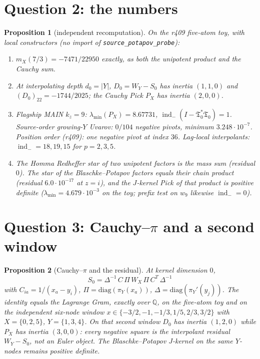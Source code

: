 \documentclass[11pt]{article}
\newtheorem{prop}{Proposition}
\theoremstyle{remark}
\newcommand{\Tfrak}{\mathfrak{T}}
\newcommand{\indm}{\operatorname{ind}_{-}}
\begin{document}
\section{Question 2: the numbers}

\begin{prop}[independent recomputation]\label{prop:q}
On the r409 five-atom toy, with local constructors
(no import of \texttt{source\_potapov\_probe}):
\begin{enumerate}
\item[(i)]
$m_X(7/3)=-7471/22950$ exactly, as both the unipotent
product and the Cauchy sum.
\item[(ii)]
At interpolating depth $d_0=\lvert Y\rvert$,
$D_0=W_Y-S_0$ has inertia $(1,1,0)$ and
$(D_0)_{22}=-1744/2025$; the Cauchy Pick $P_X$ has
inertia $(2,0,0)$.
\item[(iii)]
Flagship MAIN $k_z=9$:
$\lambda_{\min}(P_X)=8.67731$,
$\indm(I-\Tfrak_0^*\Tfrak_0)=1$.
Source-order growing-$Y$ Uvarov: $0/104$ negative
pivots, minimum $3.248\cdot 10^{-7}$.
Position order (r409): one negative pivot at index $36$.
Lag-local interpolants:
$\indm=18,19,15$ for $p=2,3,5$.
\item[(iv)]
The Homma Redheffer star of two unipotent factors is
the mass sum (residual $0$).
The star of the Blaschke--Potapov factors equals their
chain product (residual $6.0\cdot 10^{-17}$ at $z=i$),
and the $J$-kernel Pick of that product is positive
definite ($\lambda_{\min}=4.679\cdot 10^{-3}$ on the toy;
prefix test on $w_9$ likewise $\indm=0$).
\end{enumerate}
\end{prop}

\section{Question 3: Cauchy--$\pi$ and a second window}

\begin{prop}[Cauchy--$\pi$ and the residual]\label{prop:pi}
At kernel dimension $0$,
\[
S_0
=\Delta^{-1}\,C\,\Pi\,W_X\,\Pi\,C^T\,\Delta^{-1}
\]
with $C_{ia}=1/(x_a-y_i)$, $\Pi=\mathrm{diag}(\pi_Y(x_a))$,
$\Delta=\mathrm{diag}(\pi_Y'(y_j))$.
The identity equals the Lagrange Gram, exactly over
$\mathbb{Q}$, on the five-atom toy \emph{and} on the
independent six-node window
$x\in\{-3/2,-1,-1/3,1/5,2/3,3/2\}$ with
$X=\{0,2,5\}$, $Y=\{1,3,4\}$.
On that second window $D_0$ has inertia $(1,2,0)$ while
$P_X$ has inertia $(3,0,0)$: every negative square is
the interpolant residual $W_Y-S_0$, not an Euler object.
The Blaschke--Potapov $J$-kernel on the same $Y$-nodes
remains positive definite.
\end{prop}
\end{document}
